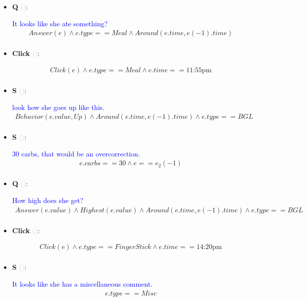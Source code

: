 \documentclass[11pt]{article}
\newcounter{CQ}
\newcounter{CS}
\newcounter{CClick}
\newcommand{\key}[1]{\textcolor{lightgray}{#1}}
\begin{document}
\begin{itemize}
	\item
	\textbf{Q\theCQ} \key{()}: \addtocounter{CQ}{1}
	\textcolor{blue}{ It looks like she ate something? }
	\begin{multline*}
	Answer(e) \wedge e.type == Meal \wedge Around(e.time, e(-1).time)  \\
	\end{multline*}
	
	\item
	\textbf{Click\theCClick} \key{()}: \addtocounter{CClick}{1}
	\begin{multline*}
	Click(e) \wedge e.type == Meal \wedge e.time == \mbox{11:55pm} \\
	\end{multline*}
	
	
	\item
	\textbf{S\theCS} \key{()}: \addtocounter{CS}{1}
	\textcolor{blue}{look how she goes up like this. }
	\begin{multline*}
    Behavior(e.value, Up) \wedge Around(e.time, e(-1).time) \wedge e.type==BGL \\ 
	\end{multline*}
	
	\item
	\textbf{S\theCS} \key{()}: \addtocounter{CS}{1}
	\textcolor{blue}{ 30 carbs, that would be an overcorrection. }
	\begin{multline*}
	e.carbs==30 \wedge e==e_2(-1) \\
	\end{multline*}
	
	
	\item
	\textbf{Q\theCQ} \key{()}: \addtocounter{CQ}{1}
	\textcolor{blue}{ How high does she get? }
	\begin{multline*}
    Answer(e.value) \wedge Highest(e.value) \wedge Around(e.time, e(-1).time) \wedge e.type==BGL \\
	\end{multline*}
	
	\item
	\textbf{Click\theCClick} \key{()}: \addtocounter{CClick}{1}
	\begin{multline*}
	Click(e) \wedge e.type == FingerStick \wedge e.time == \mbox{14:20pm} \\
	\end{multline*}
	
	\item
	\textbf{S\theCS} \key{()}: \addtocounter{CS}{1}
	\textcolor{blue}{ It looks like she has a miscellaneous comment. }
	\begin{multline*}
	e.type == Misc \\
	\end{multline*}
	

\end{itemize}
\end{document}
